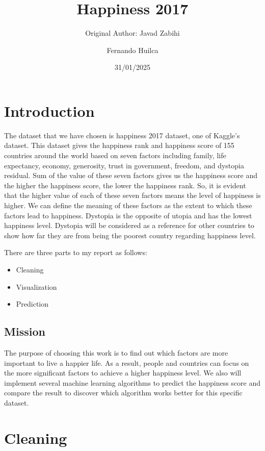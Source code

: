 \documentclass[
]{article}
\title{Happiness 2017}
\subtitle{Original Author: Javad Zabihi}
\author{Fernando Huilca}
\date{31/01/2025}
\providecommand{\tightlist}{%
  \setlength{\itemsep}{0pt}\setlength{\parskip}{0pt}}
\begin{document}
\maketitle

{
\setcounter{tocdepth}{2}
\tableofcontents
}
\section{Introduction}\label{introduction}

The dataset that we have chosen is happiness 2017 dataset, one of
Kaggle's dataset. This dataset gives the happiness rank and happiness
score of 155 countries around the world based on seven factors including
family, life expectancy, economy, generosity, trust in government,
freedom, and dystopia residual. Sum of the value of these seven factors
gives us the happiness score and the higher the happiness score, the
lower the happiness rank. So, it is evident that the higher value of
each of these seven factors means the level of happiness is higher. We
can define the meaning of these factors as the extent to which these
factors lead to happiness. Dystopia is the opposite of utopia and has
the lowest happiness level. Dystopia will be considered as a reference
for other countries to show how far they are from being the poorest
country regarding happiness level.

There are three parts to my report as follows:

\begin{itemize}
\tightlist
\item
  Cleaning
\item
  Visualization
\item
  Prediction
\end{itemize}

\subsection{Mission}\label{mission}

The purpose of choosing this work is to find out which factors are more
important to live a happier life. As a result, people and countries can
focus on the more significant factors to achieve a higher happiness
level. We also will implement several machine learning algorithms to
predict the happiness score and compare the result to discover which
algorithm works better for this specific dataset.

\section{Cleaning}\label{cleaning}
\end{document}
